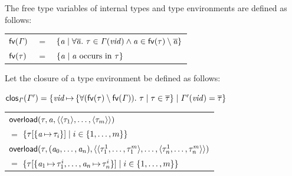 \documentclass[final]{article}
\begin{document}
The free type variables of internal types and type environments are
defined as follows:
\begin{center}
  \begin{tabular}{lll}
    $\mathsf{fv}(\mathit{\Gamma})$
    & $=$
    & $\{\mathit{a}
    \mid
    \forall\overline{\mathit{\mathit{a}}}.\ \mathit{\tau}\in\mathit{\Gamma}(\mathit{vid})
    \wedge
    \mathit{a}\in\mathsf{fv}(\mathit{\tau})\setminus\overline{\mathit{\mathit{a}}}\}$
    \\

    $\mathsf{fv}(\mathit{\tau})$
    & $=$
    & $\{\mathit{a}\mid\mathit{a}\mbox{ occurs in }\mathit{\tau}\}$
  \end{tabular}
\end{center}

Let the closure of a type environment be defined as follows:
\begin{center}
  $\mathsf{clos}_{\mathit{\Gamma}}(\mathit{\Gamma}')
  =\{\mathit{vid}\,{\mapsto}\,\{\forall(\mathsf{fv}(\mathit{\tau})\setminus\mathsf{fv}(\mathit{\Gamma})).\ \mathit{\tau}\mid\mathit{\tau}\in\overline{\mathit{\mathit{\tau}}}\}
  \mid
  \mathit{\Gamma}'(\mathit{vid})=\overline{\mathit{\mathit{\tau}}}\}$
\end{center}


\begin{center}
  \begin{tabular}{l}
    $\mathsf{overload}(\mathit{\tau},\mathit{a},\langle 
        \langle \mathit{\tau}_1 \rangle,
        \dots,
        \langle \mathit{\tau}_m \rangle
       \rangle
    )$
    \\
    \hspace*{0.2in}
    $=$
    $\{\mathit{\tau}[\{\mathit{a}\,{\mapsto}\,\mathit{\tau}_i\}]
    \mid
    i\in\{1,\dots,m\}\}$
    \\

    $\mathsf{overload}(\mathit{\tau},(\mathit{a}_0,\dots,\mathit{a}_n),\langle 
        \langle \mathit{\tau}^{1}_{1},\dots,\mathit{\tau}^{m}_{1} \rangle,
        \dots,
        \langle \mathit{\tau}^{1}_{n},\dots,\mathit{\tau}^{m}_{n} \rangle
       \rangle
    )$
    \\
    \hspace*{0.2in}
    $=$
    $\{\mathit{\tau}[\{\mathit{a}_1\,{\mapsto}\,\mathit{\tau}^{i}_{1},\dots,\mathit{a}_n\,{\mapsto}\,\mathit{\tau}^{i}_n\}]
    \mid
    i\in\{1,\dots,m\}\}$
  \end{tabular}
\end{center}
\end{document}

